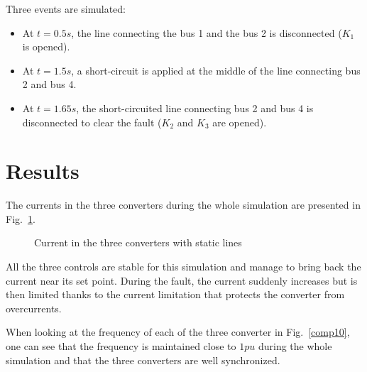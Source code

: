 \documentclass[a4paper, 12pt]{report}
\begin{document}
Three events are simulated:
\begin{itemize}
\item At $t = 0.5s$, the line connecting the bus 1 and the bus 2 is disconnected ($K_1$ is opened).
\item At $t = 1.5s$, a short-circuit is applied at the middle of the line connecting bus 2 and bus 4.
\item At $t = 1.65s$, the short-circuited line connecting bus 2 and bus 4 is disconnected to clear the fault ($K_2$ and $K_3$ are opened).
\end{itemize}

\section*{Results}

The currents in the three converters during the whole simulation are presented in Fig.~\ref{comp1}.
\begin{figure}[H]
\begin{center}
  \end{center}
  \caption{Current in the three converters with static lines\label{comp1}}
\end{figure}

All the three controls are stable for this simulation and manage to bring back the current near its set point. During the fault, the current suddenly increases but is then limited thanks to the current limitation that protects the converter from overcurrents.

\par When looking at the frequency of each of the three converter in Fig.~\ref{comp10}, one can see that the frequency is maintained close to $1 pu$ during the whole simulation and that the three converters are well synchronized.
\end{document}
